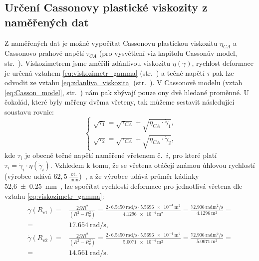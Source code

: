 \documentclass[12pt]{article}
\begin{document}
\subsection{Určení Cassonovy plastické viskozity z naměřených dat}

Z naměřených dat je možné vypočítat Cassonovu plastickou viskozitu $\eta_{CA}$ a Cassonovo prahové napětí $\tau_{CA}$ (pro vysvětlení viz kapitolu Cassonův model, str.~\pageref{sec:Casson}). Viskozimetrem jsme změřili zdánlivou viskozitu $\eta(\dot\gamma)$, rychlost deformace je určená vztahem \ref{eq:viskozimetr_gamma} (str.~\pageref{eq:viskozimetr_gamma}) a tečné napětí $\tau$ pak lze odvodit ze vztahu \ref{eq:zdanliva_viskozita} (str.~\pageref{eq:zdanliva_viskozita}). V Cassonově modelu (vztah \ref{eq:Casson_model}, str.~\pageref{eq:Casson_model}) nám pak zbývají pouze ony dvě hledané proměnné. U čokolád, které byly měřeny dvěma vřeteny, tak můžeme sestavit následující soustavu rovnic:
\begin{equation}
    \begin{cases}
        \sqrt{\tau_1} = \sqrt{\tau_{CA}} + \sqrt{\eta_{CA}\cdot\dot\gamma_1}\text{,}\\
        \sqrt{\tau_2} = \sqrt{\tau_{CA}} + \sqrt{\eta_{CA}\cdot\dot\gamma_2}\text{,}
    \end{cases}
\end{equation}
kde $\tau_i$ je obecně tečné napětí naměřené vřetenem č.~$i$, pro které platí $\tau_i = \dot\gamma_i\cdot\eta(\dot\gamma_i)$. Vzhledem k tomu, že se vřetena otáčejí známou úhlovou rychlostí (výrobce udává $62,5\:\frac{\text{ot.}}{\SI{}{\minute}}$)~\cite{man:VT-02}, a že výrobce udává průměr kádinky 52,6\SI{\pm 0,25}{\milli\metre}~\cite{man:VT-02}, lze spočítat rychlosti deformace pro jednotlivá vřetena dle vztahu \ref{eq:viskozimetr_gamma}:
\begin{align}
    \begin{split}
        \dot\gamma(R_{v1}) =& \frac{2\Omega R^2}{(R^2-R_v^2)} = \frac{2\cdot\SI{6,5450}{\radian\per\second}\cdot\SI{5,5696e-4}{\metre\squared}}{\SI{4,1296e-4}{\metre\squared}} = \frac{\SI{72,906}{\radian\metre\squared\per\second}}{\SI{4,1296}{\metre\squared}} =\\ =& \SI{17,654}{\radian\per\second}\text{,}\\
        \dot\gamma(R_{v2}) =& \frac{2\Omega R^2}{(R^2-R_v^2)} = \frac{2\cdot\SI{6,5450}{\radian\per\second}\cdot\SI{5,5696e-4}{\metre\squared}}{\SI{5,0071e-4}{\metre\squared}} = \frac{\SI{72,906}{\radian\metre\squared\per\second}}{\SI{5,0071}{\metre\squared}} =\\ =& \SI{14,561}{\radian\per\second}\text{.}
    \end{split}
\end{align}
\end{document}
